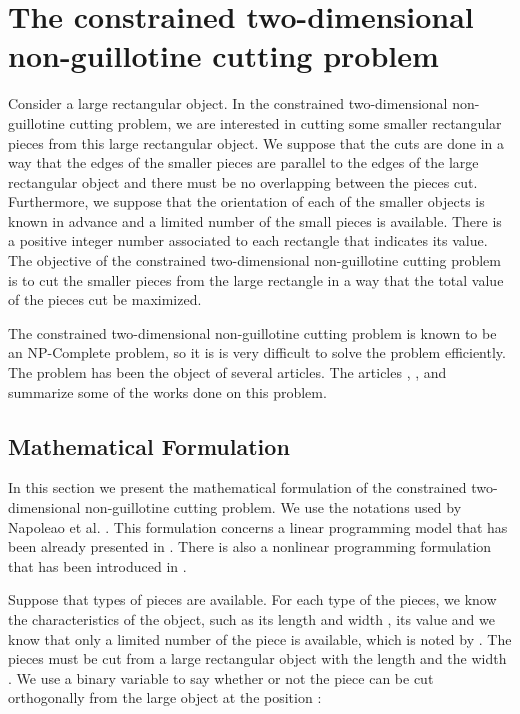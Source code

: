 \documentclass{iesmart}
\begin{document}
\section{The constrained two-dimensional non-guillotine cutting problem}
\label{sec:NGCreview}

Consider a large rectangular object. In the constrained
two-dimensional non-guillotine cutting problem, we are interested
in cutting some smaller rectangular pieces from this large
rectangular object. We suppose that the cuts are done in a way
that the edges of the smaller pieces are parallel to the edges of
the large rectangular object and there must be no overlapping
between the pieces cut. Furthermore, we suppose that the
orientation of each of the smaller objects is known in advance and
a limited number of the small pieces is available. There is a
positive integer number associated to each rectangle that
indicates its value. The objective of the constrained
two-dimensional non-guillotine cutting problem is to cut the
smaller pieces from the large rectangle in a way that the total
value of the pieces cut be maximized.

The constrained two-dimensional non-guillotine cutting problem is
known to be an NP-Complete problem, so it is is very difficult to
solve the problem efficiently. The problem has been the object of
several articles. The articles \cite{Beasley1985},
\cite{Beasley2004}, and \cite{Nepomuceno} summarize some of the
works done on this problem.


\subsection{Mathematical Formulation}\label{sec:MathFormulationNGC}

In this section we present the mathematical formulation of the
constrained two-dimensional non-guillotine cutting problem. We use
the notations used by Napoleao et al. \cite{Nepomuceno}. This
formulation concerns a  linear programming model that has
been already presented in \cite{Beasley1985}. There is also a
nonlinear programming formulation that has been introduced in
\cite{Beasley2004}.

Suppose that  types of pieces are available. For each type 
of the pieces, we know the characteristics of the object, such as
its length and width , its value  and we know that
only a limited number of the piece  is available, which is
noted by . The pieces must be cut from a large rectangular
object with the length  and the width . We use a binary
variable  to say whether or not the piece  can be cut
orthogonally from the large object at the position :
\end{document}
